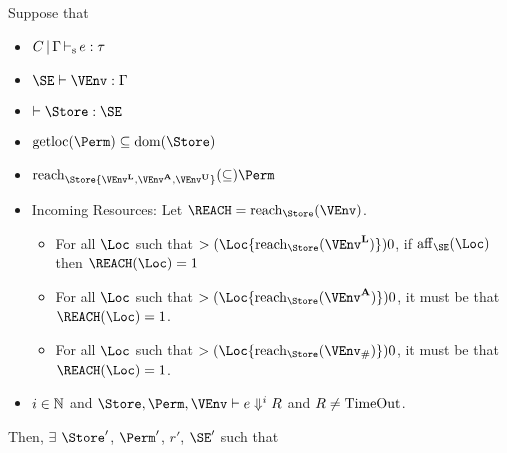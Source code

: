 \clearpage{}
\begin{theorem}[OLD]
  Suppose that
  \begin{itemize}
  \item $C \operatorname{|} \Gamma \operatorname{\vdash_s} e : \tau$
  \item $\SE \vdash \VEnv : \E$
  \item $\vdash \Store : \SE$
  \item $\Rawloc\Perm \subseteq \Dom\Store$
  \item $\Reach\Store{\Active\VEnv, \MutableBorrows\VEnv, \ImmutableBorrows\VEnv} \subseteq \Perm$
  \item Incoming Resources: Let $\REACH = \Reach\Store\VEnv$.
    \begin{itemize}
    \item
      For all $\Loc$ such that $\MultiNumber\Loc{\Reach{\Store}{\Active\VEnv}} >0$,
      if $\Affine{\SE}\Loc$ then $\MultiNumber\Loc\REACH= 1$
    \item For all $\Loc$ such that $
      \MultiNumber\Loc{\Reach{\Store}{\MutableBorrows\VEnv}} >0$, it
      must be that $\MultiNumber\Loc\REACH=1$.
    \item For all $\Loc$ such that $
      \MultiNumber\Loc{\Reach{\Store}{\Suspended\VEnv}} >0$, it
      must be that $\MultiNumber\Loc\REACH=1$.
    \end{itemize}
  \item  $i\in\mathbb{N}$ and $\Store, \Perm, \VEnv \vdash {e}
    \Downarrow^i R$ and $R\ne \operatorname{TimeOut}$.
  \end{itemize}
  Then,
  $\exists$ $\Store'$, $\Perm'$, $r'$, $\SE'$ such that
\end{theorem}
